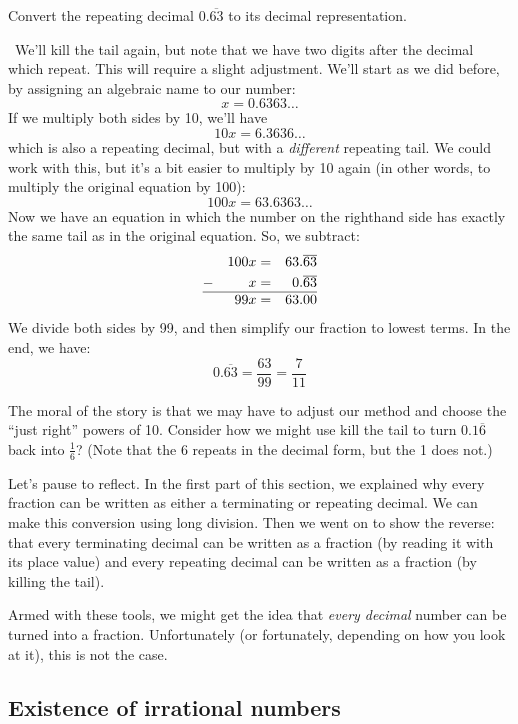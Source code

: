 \begin{boxex}
Convert the repeating decimal $0.\overline{63}$ to its decimal representation.

\exsoln\ We'll kill the tail again, but note that we have two digits after the decimal which repeat. This will require a slight adjustment. We'll start as we did before, by assigning an algebraic name to our number:\[x = 0.6363\dotso\]
If we multiply both sides by 10, we'll have \[10x = 6.3636\dotso\] which is also a repeating decimal, but with a \textit{different} repeating tail. We could work with this, but it's a bit easier to multiply by 10 again (in other words, to multiply the original equation by 100): \[100x = 63.6363\dotso\] Now we have an equation in which the number on the righthand side has exactly the same tail as in the original equation. So, we subtract:
\[\begin{aligned}
	&&	100x	&= &63.\overline{63}\\
- 	&& 	x 		&= &0.\overline{63}\\\hline
	&&	99x 	&= &63.00
\end{aligned}\] We divide both sides by 99, and then simplify our fraction to lowest terms. In the end, we have: \[0.\overline{63} = \frac{63}{99} = \frac{7}{11}\]
\end{boxex}

The moral of the story is that we may have to adjust our method and choose the ``just right'' powers of 10. Consider how we might use kill the tail to turn $0.1\overline{6}$ back into $\frac{1}{6}$? (Note that the 6 repeats in the decimal form, but the 1 does not.)

Let's pause to reflect. In the first part of this section, we explained why every fraction can be written as either a terminating or repeating decimal. We can make this conversion using long division. Then we went on to show the reverse: that every terminating decimal can be written as a fraction (by reading it with its place value) and every repeating decimal can be written as a fraction (by killing the tail).

Armed with these tools, we might get the idea that \textit{every decimal} number can be turned into a fraction. Unfortunately (or fortunately, depending on how you look at it), this is not the case.

\subsection{Existence of irrational numbers}

